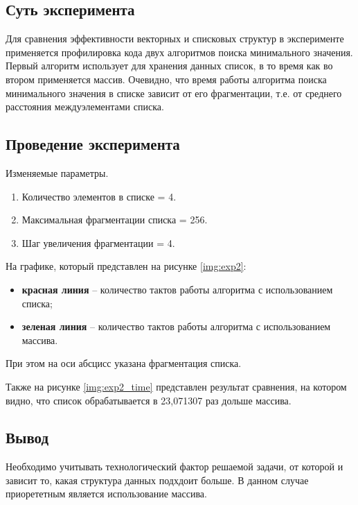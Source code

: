 \subsection{Суть эксперимента}  
Для сравнения эффективности векторных и списковых структур в эксперименте применяется профилировка кода двух алгоритмов поиска минимального значения. Первый алгоритм использует для хранения данных список, в то время как во втором применяется массив. Очевидно, что время работы алгоритма поиска минимального значения в списке зависит от его фрагментации, т.е. от среднего расстояния междуэлементами   списка. 


\subsection{Проведение эксперимента}

Изменяемые параметры.

\begin{enumerate}
	\item Количество элементов в списке = 4.
	\item Максимальная фрагментации списка = 256.
	\item Шаг увеличения фрагментации = 4.
\end{enumerate}

На графике, который представлен на рисунке \ref{img:exp2}:
\begin{itemize}
	\item \textbf{красная линия} -- количество тактов работы алгоритма с использованием списка;
	\item \textbf{зеленая линия} -- количество тактов работы алгоритма с использованием массива.
\end{itemize}

При этом на оси абсцисс указана фрагментация списка.

%

\clearpage


Также на рисунке \ref{img:exp2_time} представлен результат сравнения, на котором видно, что список обрабатывается в 23,071307 раз дольше массива.



\subsection{Вывод}

Необходимо учитывать технологический фактор решаемой задачи, от которой и зависит то, какая структура данных подхдоит больше. В данном случае приорететным является использование массива. 




